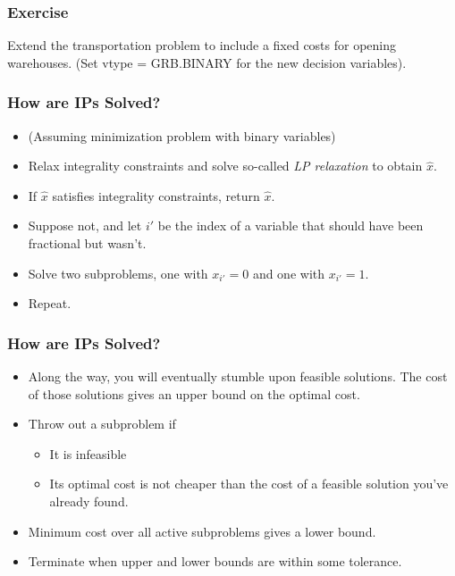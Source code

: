 \documentclass[12pt,handout]{beamer}
\begin{document}
{
\begin{frame}
\frametitle{Exercise}
Extend the transportation problem to include a fixed costs for opening warehouses. (Set vtype = GRB.BINARY for the new decision variables).
\end{frame}
}

\begin{frame}
\frametitle{How are IPs Solved?}
\begin{itemize}
\item (Assuming minimization problem with binary variables)
\item Relax integrality constraints and solve so-called {\em LP relaxation} to obtain $\hat{x}$.
\item If $\hat{x}$ satisfies integrality constraints, return $\hat{x}$.
\item Suppose not, and let $i'$ be the index of a variable that should have been fractional but wasn't.
\item Solve two subproblems, one with $x_{i'} = 0$ and one with $x_{i'} = 1$.
\item Repeat.
\end{itemize}
\end{frame}

\begin{frame}
\frametitle{How are IPs Solved?}
\begin{itemize}
\item Along the way, you will eventually stumble upon feasible solutions. The cost of those solutions gives an upper bound on the optimal cost.
\item Throw out a subproblem if
    \begin{itemize}
    \item It is infeasible
    \item Its optimal cost is not cheaper than the cost of a feasible solution you've already found.
    \end{itemize}
\item Minimum cost over all active subproblems gives a lower bound.
\item Terminate when upper and lower bounds are within some tolerance.
\end{itemize}
\end{frame}
\end{document}
